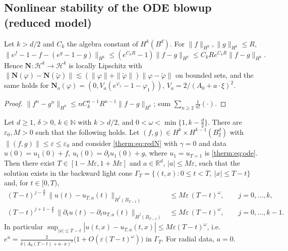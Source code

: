 \subsection{Nonlinear stability of the ODE blowup (reduced model)}
\label{therm:sec:nonlinear}

\begin{lemma}[Nonlinearity]\label{therm:lem:N}
Let $k>d/2$ and $C_k$ the algebra constant of $H^k(B^d)$.  For
$\|f\|_{H^k},\|g\|_{H^k}\le R$,
\[
\|e^{f}-1-f-(e^g-1-g)\|_{H^k}\le(e^{C_kR}-1)\|f-g\|_{H^k}\le C_kRe^{C_kR}\|f-g\|_{H^k}.
\]
Hence $\mathbf N:\mathcal H^k\to\mathcal H^k$ is locally Lipschitz with
$\|\mathbf N(\varphi)-\mathbf N(\tilde\varphi)\|\lesssim(\|\varphi\|+\|\tilde\varphi\|)\|\varphi-\tilde\varphi\|$ on bounded sets, and the
same holds for $\mathbf N_a(\varphi)=(0,V_a(e^{\varphi_1}-1-\varphi_1))$, $V_a=2/(A_0+a\cdot\xi)^2$.
\end{lemma}

\begin{proof}
$\|f^n-g^n\|_{H^k}\le nC_k^{n-1}R^{n-1}\|f-g\|_{H^k}$; sum $\sum_{n\ge2}\frac{1}{n!}(\cdot)$.
\end{proof}

\begin{theorem}[Stable ODE blowup for $u_{tt}-\Delta u=\delta e^u$; proof sketch]\label{therm:thm:reduced}
Let $d\ge1$, $\delta>0$, $k\in\mathbb{N}$ with $k>d/2$, and $0<\omega<\min\{1,k-\frac d2\}$.  There
are $\varepsilon_0,M>0$ such that the following holds.  Let $(f,g)\in H^k\times H^{k-1}(B^d_2)$ with
$\|(f,g)\|\le\varepsilon\le\varepsilon_0$ and consider \cref{therm:eq:redN} with $\gamma=0$ and data
$u(0)=u_1(0)+f$, $u_t(0)=\partial_tu_1(0)+g$, where $u_1=u_{T=1}$ is \cref{therm:eq:ode}.
Then there exist $T\in[1-M\varepsilon,1+M\varepsilon]$ and $a\in\mathbb{R}^d$, $|a|\le M\varepsilon$, such that
the solution exists in the backward light cone
$\Gamma_T=\{(t,x):0\le t<T,\ |x|\le T-t\}$ and, for $t\in[0,T)$,
\begin{align*}
  (T-t)^{j-\frac d2}\,\bigl\|u(t)-u_{T,a}(t)\bigr\|_{\dot H^j(B_{T-t})}&\le M\varepsilon\,(T-t)^{\omega},\qquad j=0,\dots,k,\\
  (T-t)^{j+1-\frac d2}\,\bigl\|\partial_tu(t)-\partial_tu_{T,a}(t)\bigr\|_{\dot H^j(B_{T-t})}&\le M\varepsilon\,(T-t)^{\omega},\qquad j=0,\dots,k-1 .
\end{align*}
In particular $\sup_{|x|\le T-t}|u(t,x)-u_{T,a}(t,x)|\le M\varepsilon(T-t)^\omega$, i.e.\
$e^{u}=\frac{2}{\delta(A_0(T-t)+a\cdot x)^2}\bigl(1+O(\varepsilon(T-t)^\omega)\bigr)$ in $\Gamma_T$.
For radial data, $a=0$.
\end{theorem}

